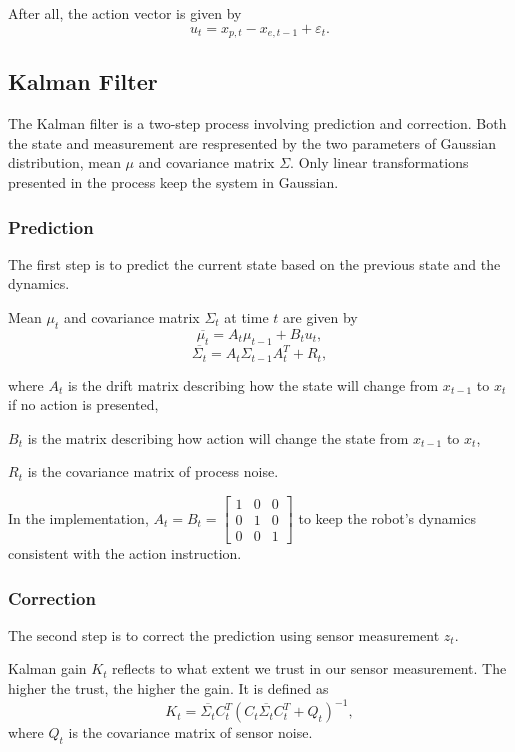 \documentclass[letterpaper,11pt]{article}
\begin{document}
After all, the action vector is given by
$$u_t = x_{p,t} - x_{e,t-1} + \varepsilon_t.$$


\subsection{Kalman Filter}

The Kalman filter is a two-step process involving prediction and correction. Both the state and measurement are respresented by the two parameters of Gaussian distribution, mean $\mu$ and covariance matrix $\Sigma$. Only linear transformations presented in the process keep the system in Gaussian.

\subsubsection{Prediction}
	The first step is to predict the current state based on the previous state	and the dynamics.

	Mean $\mu_t$ and covariance matrix $\Sigma_t$ at time $t$ are given by
	$$\overline{\mu_t} = A_t \mu_{t-1} + B_t u_t,$$
	$$\overline{\Sigma_t} = A_t \Sigma_{t-1} A_t^T + R_t,$$

	where $A_t$ is the drift matrix describing how the state will change from	$x_{t-1}$ to $x_t$ if no action is presented,

	$B_t$ is the matrix describing how action will change the state from $x_{t-1}$ to $x_t$,

	$R_t$ is the covariance matrix of process noise.
	
	In the implementation, $A_t = B_t = \begin{bmatrix}
				1 & 0 & 0\\
				0 & 1 & 0\\
				0 & 0 & 1
			   \end{bmatrix}$ to keep the robot's dynamics consistent with the action instruction.

\subsubsection{Correction}

The second step is to correct the prediction using sensor measurement $z_t$.

Kalman gain $K_t$ reflects to what extent we trust in our sensor measurement. The higher the trust, the higher the gain. It is defined as
$$K_t = \overline{\Sigma_t} C_t^T (C_t \overline{\Sigma_t} C_t^T + Q_t)^{-1},$$
where $Q_t$ is the covariance matrix of sensor noise.
\end{document}
